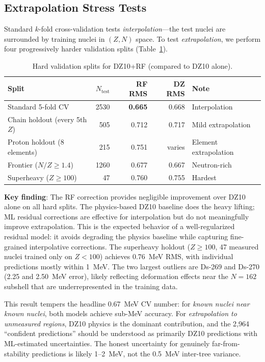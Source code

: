 \documentclass[letterpaper,11pt]{article}
\begin{document}
\subsection{Extrapolation Stress Tests}

Standard $k$-fold cross-validation tests \emph{interpolation}---the test nuclei
are surrounded by training nuclei in $(Z, N)$ space. To test
\emph{extrapolation}, we perform four progressively harder validation splits
(Table~\ref{tab:hard_validation}).

\begin{table}[h]
\centering
\caption{Hard validation splits for DZ10+RF (compared to DZ10 alone).}
\label{tab:hard_validation}
\begin{tabular}{lrrrl}
\toprule
Split & $N_\text{test}$ & RF RMS & DZ RMS & Note \\
\midrule
Standard 5-fold CV & 2530 & \textbf{0.665} & 0.668 & Interpolation \\
Chain holdout (every 5th $Z$) & 505 & 0.712 & 0.717 & Mild extrapolation \\
Proton holdout (8 elements) & 215 & 0.751 & varies & Element extrapolation \\
Frontier ($N/Z \geq 1.4$) & 1260 & 0.677 & 0.667 & Neutron-rich \\
Superheavy ($Z \geq 100$) & 47 & 0.760 & 0.755 & Hardest \\
\bottomrule
\end{tabular}
\end{table}

\textbf{Key finding}: The RF correction provides negligible improvement over
DZ10 alone on all hard splits. The physics-based DZ10 baseline does the heavy
lifting; ML residual corrections are effective for interpolation but do not
meaningfully improve extrapolation. This is the expected behavior of a
well-regularized residual model: it avoids degrading the physics baseline while
capturing fine-grained interpolative corrections. The superheavy holdout
($Z \geq 100$, 47 measured nuclei trained only on $Z < 100$) achieves 0.76~MeV
RMS, with individual predictions mostly within 1~MeV. The two largest outliers
are Ds-269 and Ds-270 (2.25 and 2.50~MeV error), likely reflecting deformation
effects near the $N = 162$ subshell that are underrepresented in the training
data.

This result tempers the headline 0.67~MeV CV number: for \emph{known nuclei
near known nuclei}, both models achieve sub-MeV accuracy. For
\emph{extrapolation to unmeasured regions}, DZ10 physics is the dominant
contribution, and the 2,964 ``confident predictions'' should be understood as
primarily DZ10 predictions with ML-estimated uncertainties. The honest
uncertainty for genuinely far-from-stability predictions is likely 1--2~MeV,
not the 0.5~MeV inter-tree variance.
\end{document}
